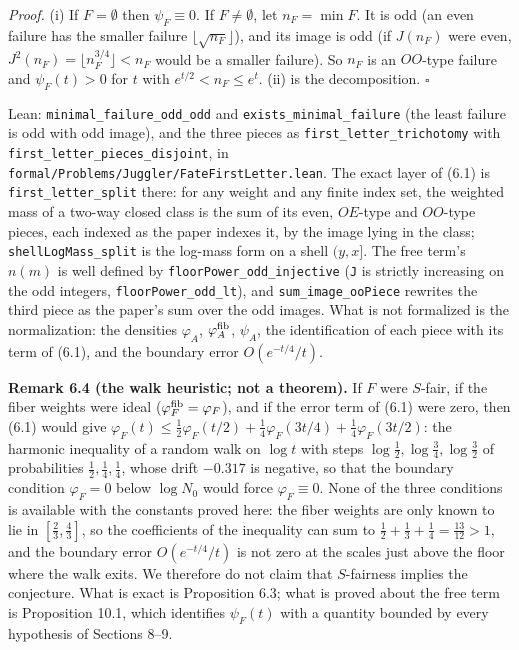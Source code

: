 \documentclass[11pt,a4paper]{article}
\begin{document}
\emph{Proof.} (i) If \(F=\emptyset\) then \(\psi_F\equiv 0\). If
\(F\ne\emptyset\), let \(n_F=\min F\). It is odd (an even failure has
the smaller failure \(\lfloor\sqrt{n_F}\rfloor\)), and its image is odd
(if \(J(n_F)\) were even, \(J^2(n_F)=\lfloor n_F^{3/4}\rfloor<n_F\)
would be a smaller failure). So \(n_F\) is an \(OO\)-type failure and
\(\psi_F(t)>0\) for \(t\) with \(e^{t/2}<n_F\le e^t\). (ii) is the
decomposition. \(\square\)

Lean: \texttt{\nolinkurl{minimal_failure_odd_odd}} and
\texttt{\nolinkurl{exists_minimal_failure}} (the least failure is odd
with odd image), and the three pieces as
\texttt{\nolinkurl{first_letter_trichotomy}} with
\texttt{\nolinkurl{first_letter_pieces_disjoint}}, in
\texttt{\nolinkurl{formal/Problems/Juggler/FateFirstLetter.lean}}. The
exact layer of (6.1) is \texttt{\nolinkurl{first_letter_split}} there:
for any weight and any finite index set, the weighted mass of a two-way
closed class is the sum of its even, \(OE\)-type and \(OO\)-type pieces,
each indexed as the paper indexes it, by the image lying in the class;
\texttt{\nolinkurl{shellLogMass_split}} is the log-mass form on a shell
\((y,x]\). The free term's \(n(m)\) is well defined by
\texttt{\nolinkurl{floorPower_odd_injective}} (\texttt{\nolinkurl{J}} is
strictly increasing on the odd integers,
\texttt{\nolinkurl{floorPower_odd_lt}}), and
\texttt{\nolinkurl{sum_image_ooPiece}} rewrites the third piece as the
paper's sum over the odd images. What is not formalized is the
normalization: the densities \(\varphi_A\), \(\varphi^{\rm fib}_A\),
\(\psi_A\), the identification of each piece with its term of (6.1), and
the boundary error \(O(e^{-t/4}/t)\).

\textbf{Remark 6.4 (the walk heuristic; not a theorem).} If \(F\) were
\(S\)-fair, if the fiber weights were ideal
(\(\varphi^{\rm fib}_F=\varphi_F\)), and if the error term of (6.1) were
zero, then (6.1) would give
\(\varphi_F(t)\le\tfrac12\varphi_F(t/2)+\tfrac14\varphi_F(3t/4)+\tfrac14\varphi_F(3t/2)\):
the harmonic inequality of a random walk on \(\log t\) with steps
\(\log\tfrac12,\log\tfrac34,\log\tfrac32\) of probabilities
\(\tfrac12,\tfrac14,\tfrac14\), whose drift \(-0.317\) is negative, so
that the boundary condition \(\varphi_F=0\) below \(\log N_0\) would
force \(\varphi_F\equiv 0\). None of the three conditions is available
with the constants proved here: the fiber weights are only known to lie
in \([\tfrac23,\tfrac43]\), so the coefficients of the inequality can
sum to \(\tfrac12+\tfrac13+\tfrac14=\tfrac{13}{12}>1\), and the boundary
error \(O(e^{-t/4}/t)\) is not zero at the scales just above the floor
where the walk exits. We therefore do not claim that \(S\)-fairness
implies the conjecture. What is exact is Proposition 6.3; what is proved
about the free term is Proposition 10.1, which identifies \(\psi_F(t)\)
with a quantity bounded by every hypothesis of Sections 8--9.
\end{document}
